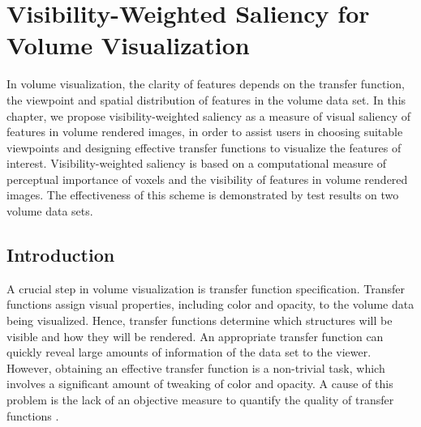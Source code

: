 \chapter{Visibility-Weighted Saliency for Volume Visualization \label{visibility-weighted_saliency}}
In volume visualization, the clarity of features depends on the transfer function, the viewpoint and spatial distribution of features in the volume data set.
In this chapter, we propose visibility-weighted saliency as a measure of visual saliency of features in volume rendered images, in order to assist users in choosing suitable viewpoints and designing effective transfer functions to visualize the features of interest. Visibility-weighted saliency is based on a computational measure of perceptual importance of voxels and the visibility of features in volume rendered images.
The effectiveness of this scheme is demonstrated by test results on two volume data sets.

\section{Introduction}

A crucial step in volume visualization is transfer function specification.
Transfer functions assign visual properties, including color and opacity, to the volume data being visualized. Hence, transfer functions determine which structures will be visible and how they will be rendered.
An appropriate transfer function can quickly reveal large amounts of information of the data set to the viewer.
However, obtaining an effective transfer function is a non-trivial task, which involves a significant amount of tweaking of color and opacity.
A cause of this problem is the lack of an objective measure to quantify the quality of transfer functions \cite{correa_visibility_2011}.

